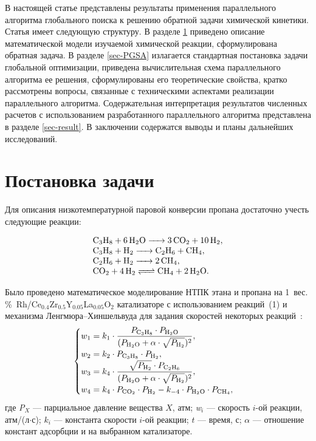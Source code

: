 \documentclass{cmi}
\begin{document}
В настоящей статье представлены результаты применения параллельного алгоритма глобального поиска к решению обратной задачи химической кинетики. Статья имеет следующую структуру. 
В разделе \ref{sec-problem} приведено описание математической модели изучаемой химической реакции, сформулирована обратная задача.
В разделе \ref{sec-PGSA} излагается стандартная постановка задачи глобальной оптимизации, приведена вычислительная схема параллельного алгоритма ее решения, сформулированы его теоретические свойства, кратко рассмотрены вопросы, связанные с техническими аспектами реализации параллельного алгоритма.
Содержательная интерпретация результатов численных расчетов с использованием разработанного параллельного алгоритма представлена в разделе \ref{sec-result}.
В заключении содержатся выводы и планы дальнейших исследований.

\section{Постановка задачи}
\label{sec-problem}

Для описания низкотемпературной паровой конверсии пропана достаточно учесть следующие реакции:

\begin{equation}\label{eq1}
\begin{array}{l}
\ce{C3H8 + 6H2O -> 3CO2 + 10H2}, \\
\ce{C3H8 + H2 -> C2H6 + CH4}, \\
\ce{C2H6 + H2 -> 2CH4}, \\
\ce{CO2 + 4H2 <=> CH4 + 2H2O}. \\
\end{array}
\end{equation}

Было проведено математическое моделирование НТПК этана и пропана на 1~вес.\,\%~Rh/Ce$_{0.4}$Zr$_{0.5}$Y$_{0.05}$La$_{0.05}$O$_{2}$ катализаторе с использованием реакций~(1) и механизма Ленгмюра--Хиншельвуда для задания скоростей некоторых реакций~:
\begin{equation}
\begin{cases}
\displaystyle w_{1} = k_{1} \cdot \frac{P_{\ce{C3H8}}\cdot P_{\ce{H2O}}}{(P_{\ce{H2O}}+\alpha\cdot\sqrt{P_{\ce{H2}}})^2}, \\
\displaystyle w_{2} = k_{2} \cdot P_{\ce{C3H8}} \cdot P_{\ce{H2}}, \\
\displaystyle w_{3} = k_{4}\cdot \frac{\sqrt{P_{\ce{H2}}}\cdot P_{\ce{C2H6}}}{(P_{\ce{H2O}}+\alpha\cdot\sqrt{P_{\ce{H2}}})^2},\\
\displaystyle w_{4} = k_{4}\cdot P_{\ce{CO2}}\cdot P_{\ce{H2}}-k_{-4}\cdot P_{\ce{H2O}}\cdot P_{\ce{CH4}},\\
\end{cases}
\end{equation}
где \textit{P}$_{X}$ --- парциальное давление вещества $X$, атм; \textit{w}$_{i}$ --- скорость $i$-ой реакции, атм/(л$\cdot$с); $k_{i}$ --- константа скорости $i$-ой реакции; $t$ --- время, с; $\alpha$ --- отношение констант адсорбции  и  на выбранном катализаторе.
\end{document}
